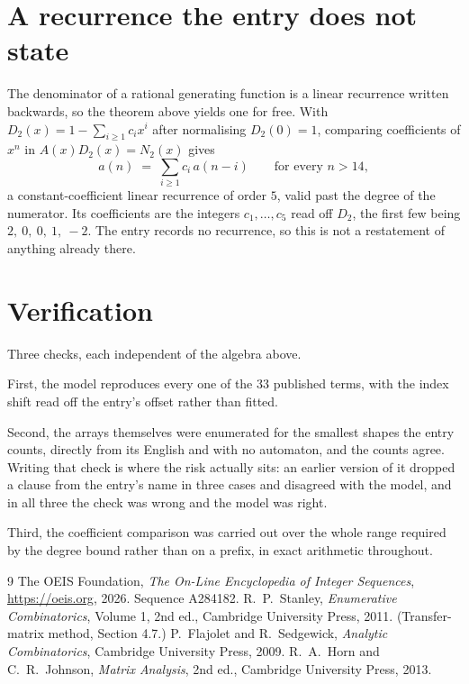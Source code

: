 \documentclass[11pt,a4paper]{article}
\theoremstyle{plain}
\theoremstyle{definition}
\begin{document}
\section{A recurrence the entry does not state}

The denominator of a rational generating function is a linear recurrence written backwards, so
the theorem above yields one for free. With $D_2(x)=1-\sum_{i\ge1}c_ix^i$ after normalising
$D_2(0)=1$, comparing coefficients of $x^n$ in $A(x)D_2(x)=N_2(x)$ gives
\[
a(n)\;=\;\sum_{i\ge1}c_i\,a(n-i)\qquad\text{for every }n>14,
\]
a constant-coefficient linear recurrence of order $5$, valid past the degree of the
numerator. Its coefficients are the integers $c_1,\dots,c_{5}$ read off $D_2$, the first few being $2,\ 0,\ 0,\ 1,\ -2$. The entry records no recurrence, so this is not a restatement of anything
already there.

\section{Verification}

Three checks, each independent of the algebra above.

First, the model reproduces every one of the $33$ published terms, with the index shift
read off the entry's offset rather than fitted.

Second, the arrays themselves were enumerated for the smallest shapes the entry counts,
directly from its English and with no automaton, and the counts agree. Writing that check is
where the risk actually sits: an earlier version of it dropped a clause from the entry's name
in three cases and disagreed with the model, and in all three the check was wrong and the model
was right.

Third, the coefficient comparison was carried out over the whole range required by the degree
bound rather than on a prefix, in exact arithmetic throughout.

\begin{thebibliography}{9}
 The OEIS Foundation, \emph{The On-Line Encyclopedia of Integer
Sequences}, \url{https://oeis.org}, 2026. Sequence A284182.
 R.~P.~Stanley, \emph{Enumerative Combinatorics}, Volume 1, 2nd ed.,
Cambridge University Press, 2011. (Transfer-matrix method, Section 4.7.)
 P.~Flajolet and R.~Sedgewick, \emph{Analytic Combinatorics}, Cambridge
University Press, 2009.
 R.~A.~Horn and C.~R.~Johnson, \emph{Matrix Analysis}, 2nd ed., Cambridge
University Press, 2013.
\end{thebibliography}
\end{document}
